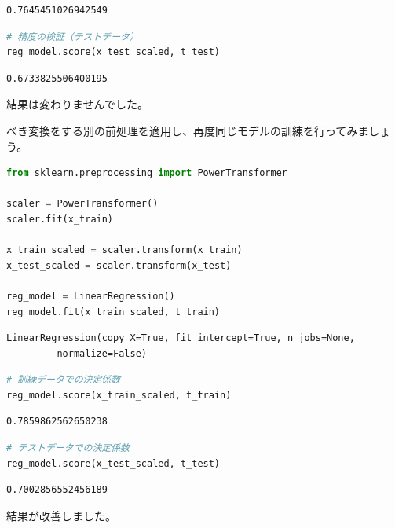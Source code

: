 \begin{lstlisting}[style=outputcell]
0.7645451026942549
\end{lstlisting}

\begin{lstlisting}[style=codecell,language=Python]
# 精度の検証（テストデータ）
reg_model.score(x_test_scaled, t_test)
\end{lstlisting}

\begin{lstlisting}[style=outputcell]
0.6733825506400195
\end{lstlisting}

結果は変わりませんでした。


べき変換をする別の前処理を適用し、再度同じモデルの訓練を行ってみましょう。


\begin{lstlisting}[style=codecell,language=Python]
from sklearn.preprocessing import PowerTransformer

scaler = PowerTransformer()
scaler.fit(x_train)

x_train_scaled = scaler.transform(x_train)
x_test_scaled = scaler.transform(x_test)

reg_model = LinearRegression()
reg_model.fit(x_train_scaled, t_train)
\end{lstlisting}

\begin{lstlisting}[style=outputcell]
LinearRegression(copy_X=True, fit_intercept=True, n_jobs=None,
         normalize=False)
\end{lstlisting}

\begin{lstlisting}[style=codecell,language=Python]
# 訓練データでの決定係数
reg_model.score(x_train_scaled, t_train)
\end{lstlisting}

\begin{lstlisting}[style=outputcell]
0.7859862562650238
\end{lstlisting}

\begin{lstlisting}[style=codecell,language=Python]
# テストデータでの決定係数
reg_model.score(x_test_scaled, t_test)
\end{lstlisting}

\begin{lstlisting}[style=outputcell]
0.7002856552456189
\end{lstlisting}

結果が改善しました。


